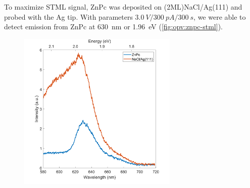 




To maximize \ac{STML} signal, ZnPc was deposited on (2ML)NaCl/Ag(111) and probed with the Ag tip. With parameters $\SI{3.0}{V}/\SI{300}{pA}/\SI{300}{s}$, we were able to detect emission from ZnPc at \SI{630}{nm} or \SI{1.96}{eV} (\autoref{fig:opv:znpc-stml}).

\begin{figure} [h]
    \centering
    \includegraphics[width=3in]{pictures/stml_znpc_ag111.png}
    \caption{}
    \label{fig:opv:znpc-stml}
\end{figure}




